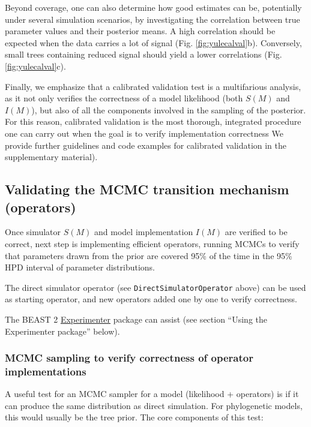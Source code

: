 \documentclass[oneside]{article}
\begin{document}
Beyond coverage, one can also determine how good estimates can be,
potentially under several simulation scenarios, by investigating the
correlation between true parameter values and their posterior means.
A high correlation should be expected when the data carries a lot of
signal (Fig. \ref{fig:yulecalval}b).
Conversely, small trees containing reduced signal should yield a lower
correlations (Fig. \ref{fig:yulecalval}c).


Finally, we emphasize that a calibrated validation test is a multifarious
analysis, as it not only verifies the correctness of a model
likelihood (both $S(M)$ and $I(M)$), but also of all the components
involved in the sampling of the posterior.
For this reason, calibrated validation is the most thorough,
integrated procedure one can carry out when the goal is to verify
implementation correctness
We provide further guidelines and code examples for
calibrated validation in the supplementary material).

\subsection*{Validating the MCMC transition mechanism (operators)}

Once simulator \(S(M)\) and model implementation \(I(M)\) are verified
to be correct, next step is implementing efficient operators, running
MCMCs to verify that parameters drawn from the prior are covered 95\% of
the time in the 95\% HPD interval of parameter distributions.

The direct simulator operator (see \texttt{DirectSimulatorOperator}
above) can be used as starting operator, and new operators added one by
one to verify correctness.

The BEAST 2
\href{https://github.com/rbouckaert/Experimenter}{Experimenter} package
can assist (see section ``Using the Experimenter package'' below).

\subsubsection{MCMC sampling to verify correctness of operator
implementations}\label{mcmc-sampling-to-verify-correctness-of-operator-implementations}

A useful test for an MCMC sampler for a model (likelihood + operators)
is if it can produce the same distribution as direct simulation. For
phylogenetic models, this would usually be the tree prior. The core
components of this test:
\end{document}
